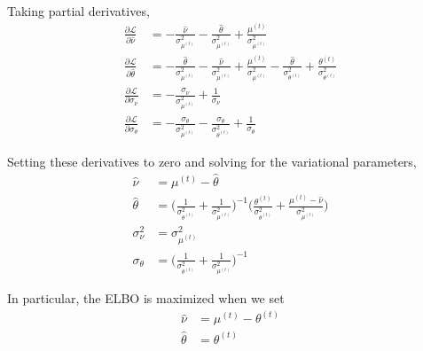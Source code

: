\documentclass[10pt]{article}
\theoremstyle{plain}
\theoremstyle{definition}
\newcommand{\<}{\langle}
\renewcommand{\>}{\rangle}
\begin{document}
Taking partial derivatives, 
\begin{align}
\frac{\partial \mathcal L}{\partial \hat\nu} &= - \frac{\hat \nu}{\sigma^2_{\mu^{(t)}}} - \frac{\hat \theta}{\sigma^2_{\mu^{(t)}}} +  \frac{\mu^{(t)}}{\sigma^2_{\mu^{(t)}}} \\
\frac{\partial \mathcal L}{\partial \hat\theta} 	&=  - \frac{\hat \theta}{\sigma^2_{\mu^{(t)}}} - \frac{\hat \nu}{\sigma^2_{\mu^{(t)}}} +  \frac{\mu^{(t)}}{\sigma^2_{\mu^{(t)}}} - \frac{\hat\theta}{\sigma^2_{\theta^{(t)}}} + \frac{\theta^{(t)}}{\sigma^2_{\theta^{(t)}}}\\
\frac{\partial \mathcal L}{\partial \sigma_\nu} &= - \frac{\sigma_\nu}{\sigma^2_{\mu^{(t)}}} + \frac{1}{\sigma_\nu}\\
\frac{\partial \mathcal L}{\partial \sigma_\theta} &= - \frac{\sigma_\theta} {\sigma^2_{\mu^{(t)}}} - \frac{\sigma_\theta}{\sigma_{\theta^{(t)}}^2}+ \frac{1}{\sigma_\theta}
\end{align}

Setting these derivatives to zero and solving for the variational parameters, 
\begin{align}
\hat \nu &= \mu^{(t)} - \hat\theta\\
\hat \theta &= \Big(\frac{1}{\sigma^2_{\theta^{(t)}}}  + \frac{1}{\sigma^2_{\mu^{(t)}} }\Big)^{-1}\Big(\frac{\theta^{(t)}}{\sigma^2_{\theta^{(t)}}} + \frac{\mu^{(t)}  - \hat\nu}{\sigma^2_{\mu^{(t)}}}\Big)\\
\sigma_\nu^2 &= \sigma^2_{\mu^{(t)}}\\
\sigma_\theta &= \Big(\frac{1}{\sigma^2_{\theta^{(t)}}}  + \frac{1}{\sigma^2_{\mu^{(t)}} }\Big)^{-1}
\end{align}

In particular, the ELBO is maximized when we set 
\begin{align*}
\hat \nu &= \mu^{(t)} - \theta^{(t)}\\
\hat \theta &= \theta^{(t)}
\end{align*}
\end{document}
